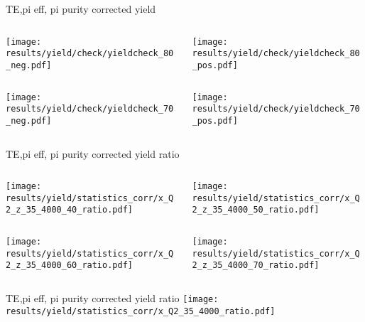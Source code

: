 \begin{frame}{TE,pi eff, pi purity corrected yield}
\begin{columns}
\begin{column}[T]{0.5\textwidth}
\texttt{[image: results/yield/check/yieldcheck\_80\_neg.pdf]}
\end{column}
\begin{column}[T]{0.5\textwidth}
\texttt{[image: results/yield/check/yieldcheck\_80\_pos.pdf]}
\end{column}
\end{columns}
\begin{columns}
\begin{column}[T]{0.5\textwidth}
\texttt{[image: results/yield/check/yieldcheck\_70\_neg.pdf]}
\end{column}
\begin{column}[T]{0.5\textwidth}
\texttt{[image: results/yield/check/yieldcheck\_70\_pos.pdf]}
\end{column}
\end{columns}
\end{frame}
\begin{frame}{TE,pi eff, pi purity corrected yield ratio}
\begin{columns}
\begin{column}[T]{0.5\textwidth}
\texttt{[image: results/yield/statistics\_corr/x\_Q2\_z\_35\_4000\_40\_ratio.pdf]}
\end{column}
\begin{column}[T]{0.5\textwidth}
\texttt{[image: results/yield/statistics\_corr/x\_Q2\_z\_35\_4000\_50\_ratio.pdf]}
\end{column}
\end{columns}
\begin{columns}
\begin{column}[T]{0.5\textwidth}
\texttt{[image: results/yield/statistics\_corr/x\_Q2\_z\_35\_4000\_60\_ratio.pdf]}
\end{column}
\begin{column}[T]{0.5\textwidth}
\texttt{[image: results/yield/statistics\_corr/x\_Q2\_z\_35\_4000\_70\_ratio.pdf]}
\end{column}
\end{columns}
\end{frame}
\begin{frame}{TE,pi eff, pi purity corrected yield ratio}
\texttt{[image: results/yield/statistics\_corr/x\_Q2\_35\_4000\_ratio.pdf]}
\end{frame}
